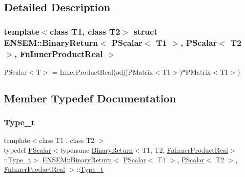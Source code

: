 \subsection{Detailed Description}
\subsubsection*{template$<$class T1, class T2$>$\newline
struct E\+N\+S\+E\+M\+::\+Binary\+Return$<$ P\+Scalar$<$ T1 $>$, P\+Scalar$<$ T2 $>$, Fn\+Inner\+Product\+Real $>$}

P\+Scalar$<$\+T$>$ = Inner\+Product\+Real(adj(\+P\+Matrix$<$\+T1$>$)$\ast$\+P\+Matrix$<$\+T1$>$) 

\subsection{Member Typedef Documentation}
\mbox{\label{structENSEM_1_1BinaryReturn_3_01PScalar_3_01T1_01_4_00_01PScalar_3_01T2_01_4_00_01FnInnerProductReal_01_4_a20722f3bcaa8e004d4ff8dd5e7007fda}} 
\subsubsection{\texorpdfstring{Type\_t}{Type\_t}\hspace{0.1cm}{\footnotesize\ttfamily [1/2]}}
{\footnotesize\ttfamily template$<$class T1 , class T2 $>$ \\
typedef \mbox{\hyperlink{classENSEM_1_1PScalar}{P\+Scalar}}$<$typename \mbox{\hyperlink{structENSEM_1_1BinaryReturn}{Binary\+Return}}$<$T1, T2, \mbox{\hyperlink{structENSEM_1_1FnInnerProductReal}{Fn\+Inner\+Product\+Real}}$>$\+::\mbox{\hyperlink{structENSEM_1_1BinaryReturn_3_01PScalar_3_01T1_01_4_00_01PScalar_3_01T2_01_4_00_01FnInnerProductReal_01_4_a20722f3bcaa8e004d4ff8dd5e7007fda}{Type\+\_\+t}}$>$ \mbox{\hyperlink{structENSEM_1_1BinaryReturn}{E\+N\+S\+E\+M\+::\+Binary\+Return}}$<$ \mbox{\hyperlink{classENSEM_1_1PScalar}{P\+Scalar}}$<$ T1 $>$, \mbox{\hyperlink{classENSEM_1_1PScalar}{P\+Scalar}}$<$ T2 $>$, \mbox{\hyperlink{structENSEM_1_1FnInnerProductReal}{Fn\+Inner\+Product\+Real}} $>$\+::\mbox{\hyperlink{structENSEM_1_1BinaryReturn_3_01PScalar_3_01T1_01_4_00_01PScalar_3_01T2_01_4_00_01FnInnerProductReal_01_4_a20722f3bcaa8e004d4ff8dd5e7007fda}{Type\+\_\+t}}}

